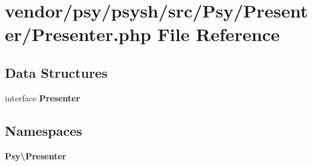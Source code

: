 \section{vendor/psy/psysh/src/\+Psy/\+Presenter/\+Presenter.php File Reference}
\label{psy_2psysh_2src_2_psy_2_presenter_2_presenter_8php}
\subsection*{Data Structures}
\begin{DoxyCompactItemize}
\item 
interface {\bf Presenter}
\end{DoxyCompactItemize}
\subsection*{Namespaces}
\begin{DoxyCompactItemize}
\item 
 {\bf Psy\textbackslash{}\+Presenter}
\end{DoxyCompactItemize}

